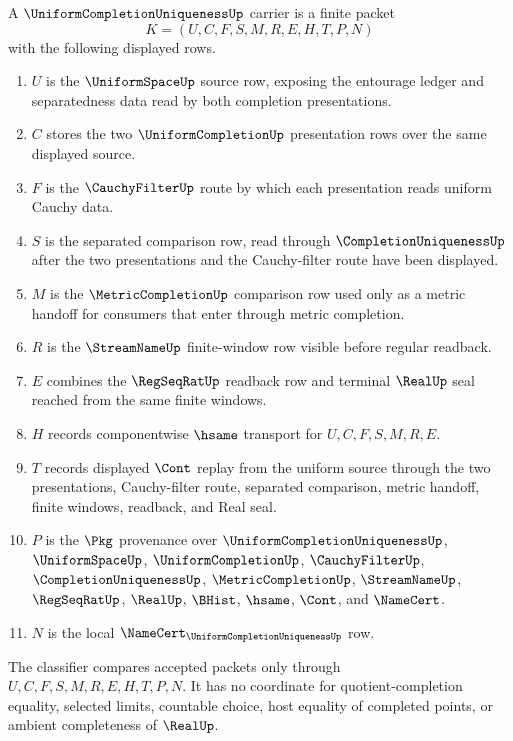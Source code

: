 \begin{definition}
\label{def:uniform-completion-uniqueness-carrier}
A $\UniformCompletionUniquenessUp$ carrier is a finite packet
$$
K=(U,C,F,S,M,R,E,H,T,P,N)
$$
with the following displayed rows.
\begin{enumerate}
\item $U$ is the $\UniformSpaceUp$ source row, exposing the entourage ledger and separatedness data read by both completion presentations.
\item $C$ stores the two $\UniformCompletionUp$ presentation rows over the same displayed source.
\item $F$ is the $\CauchyFilterUp$ route by which each presentation reads uniform Cauchy data.
\item $S$ is the separated comparison row, read through $\CompletionUniquenessUp$ after the two presentations and the Cauchy-filter route have been displayed.
\item $M$ is the $\MetricCompletionUp$ comparison row used only as a metric handoff for consumers that enter through metric completion.
\item $R$ is the $\StreamNameUp$ finite-window row visible before regular readback.
\item $E$ combines the $\RegSeqRatUp$ readback row and terminal $\RealUp$ seal reached from the same finite windows.
\item $H$ records componentwise $\hsame$ transport for $U,C,F,S,M,R,E$.
\item $T$ records displayed $\Cont$ replay from the uniform source through the two presentations, Cauchy-filter route, separated comparison, metric handoff, finite windows, readback, and Real seal.
\item $P$ is the $\Pkg$ provenance over $\UniformCompletionUniquenessUp$, $\UniformSpaceUp$, $\UniformCompletionUp$, $\CauchyFilterUp$, $\CompletionUniquenessUp$, $\MetricCompletionUp$, $\StreamNameUp$, $\RegSeqRatUp$, $\RealUp$, $\BHist$, $\hsame$, $\Cont$, and $\NameCert$.
\item $N$ is the local $\NameCert_{\UniformCompletionUniquenessUp}$ row.
\end{enumerate}
The classifier compares accepted packets only through $U,C,F,S,M,R,E,H,T,P,N$. It has no coordinate for quotient-completion equality, selected limits, countable choice, host equality of completed points, or ambient completeness of $\RealUp$.
\end{definition}

